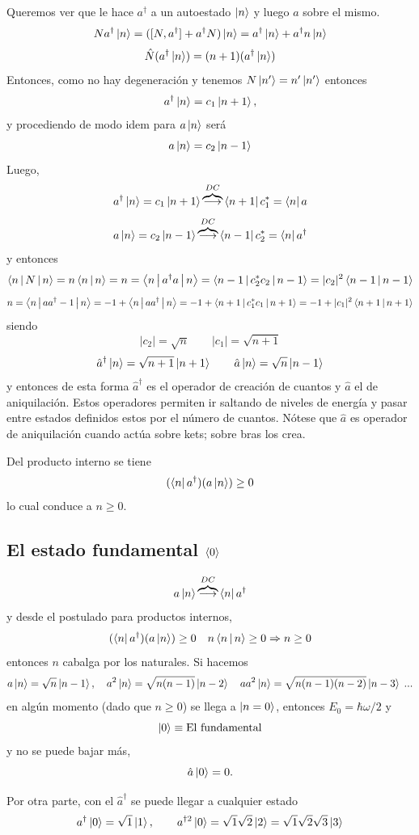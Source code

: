 \documentclass[10pt,oneside]{CBFT_book}
\begin{document}
Queremos ver que le  hace $a^\dagger$  a un autoestado $\Ket{n}$ y luego $a$ sobre el mismo.
\[
	N a^\dagger \Ket{n} = ([N, a^\dagger] + a^\dagger N) \Ket{n} =
	a^\dagger \Ket{n} + a^\dagger n \Ket{n} 
\]
\[
	\Hat{N} (a^\dagger\Ket{n}) = (n+1)(a^\dagger\Ket{n})
\]
Entonces, como no hay degeneración y tenemos $N\Ket{n'} = n'\Ket{n'}$ entonces 
\[
	a^\dagger \Ket{n} = c_1 \Ket{n+1},
\]
y procediendo de modo idem para $a\ket{n}$ será
\[
	a \Ket{n} = c_2 \Ket{n-1}
\]
Luego,
\[
	a^\dagger \Ket{n} = c_1 \Ket{n+1} \overbrace{\longrightarrow}^{DC} 
	\Bra{n+1} c_1^* = \Bra{n} a 
\]
\[
	a \Ket{n} = c_2 \Ket{n-1} \overbrace{\longrightarrow}^{DC} \Bra{n-1} c_2^* = \Bra{n} a^\dagger
\]
y entonces 
\[
	\Braket{n|N|n} = n \Braket{n|n} = n =  \Braket{n| a^\dagger a |n} =  \Braket{n-1|c_2^* c_2|n-1} =
	|c_2|^2 \Braket{n-1|n-1}
\]
\[
	n = \Braket{n|aa^\dagger-1|n} = -1 + \Braket{n|aa^\dagger|n} = - 1 + \Braket{n+1|c_1^*c_1|n+1} =
	-1 + |c_1|^2 \Braket{n+1|n+1}
\]
siendo
\[
	|c_2| = \sqrt{n} \qquad |c_1| = \sqrt{n+1} 
\]
\[
	\hat{a}^\dagger \Ket{n} = \sqrt{n+1} \Ket{n+1} \qquad  \hat{a}\Ket{n} = \sqrt{n} \Ket{n-1} 
\]
y entonces de esta forma $\hat{a}^\dagger$ es el operador de creación de cuantos y $\hat{a}$ el de 
aniquilación.
Estos operadores permiten ir saltando de niveles de energía y pasar entre estados definidos estos
por el número de cuantos.
Nótese que $\hat{a}$ es operador de aniquilación cuando actúa sobre kets; sobre bras los crea.

Del producto interno se tiene
\[
	(\Bra{n}a^\dagger)(a\Ket{n}) \geq 0
\]
lo cual conduce a $ n \geq 0 $.

\subsection{El estado fundamental $\Braket{0}$}

\[
	a \Ket{n}  \overbrace{\longrightarrow}^{DC} \Bra{n} a^\dagger
\]
y desde el postulado para productos internos,
\[
	(\Bra{n}a^\dagger)(a\Ket{n}) \geq 0 \quad n \Braket{n|n} \geq 0 \Rightarrow n \geq 0 
\]
entonces $n$ cabalga por los naturales.
Si hacemos 
\[
	a\Ket{n} = \sqrt{n} \Ket{n-1}, \quad  
	a^2 \Ket{n} = \sqrt{n (n-1)} \Ket{n-2} \quad 
	a a^2 \Ket{n} = \sqrt{n (n-1)(n-2)} \Ket{n-3} \; ...
\]
en algún momento (dado que $n\geq 0$) se llega a $\Ket{n=0}$, entonces $E_0 = \hbar\omega/2$ y 
\[
	\Ket{0} \equiv \text{El fundamental}
\]
y no se puede bajar más,
\[
	\hat{a}\Ket{0} = 0.
\]

Por otra parte, con el $\hat{a}^\dagger$ se puede llegar a cualquier estado
\[
	a^\dagger \Ket{0} = \sqrt{1} \Ket{1}, \qquad  a^{\dagger 2} \Ket{0} = \sqrt{1}\sqrt{2} \Ket{2} = 
	\sqrt{1}\sqrt{2}\sqrt{3} \Ket{3}
\]
\end{document}
